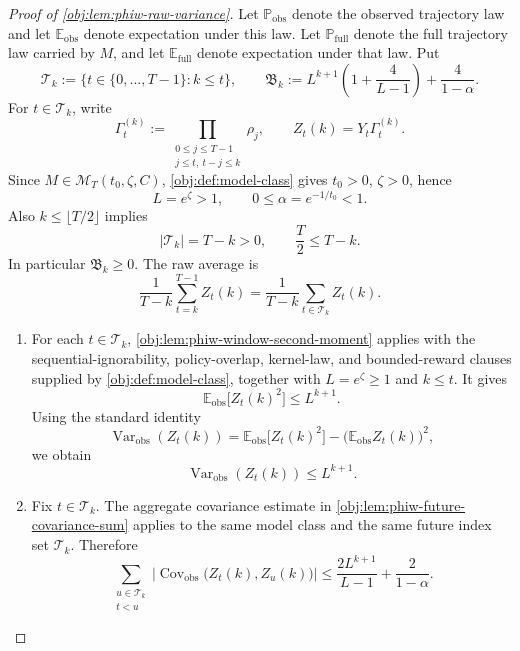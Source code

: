 \documentclass[11pt]{article}
\begin{document}
\begin{proof}[Proof of \cref{obj:lem:phiw-raw-variance}]
Let \(\mathbb P_{\mathrm{obs}}\) denote the observed trajectory law and let
\(\mathbb E_{\mathrm{obs}}\) denote expectation under this law.  Let
\(\mathbb P_{\mathrm{full}}\) denote the full trajectory law carried by \(M\),
and let \(\mathbb E_{\mathrm{full}}\) denote expectation under that law.  Put
\[
\mathscr T_k:=\{t\in\{0,\ldots,T-1\}: k\le t\},
\qquad
\mathfrak B_k:=
L^{k+1}\left(1+\frac{4}{L-1}\right)+\frac{4}{1-\alpha}.
\]
For \(t\in\mathscr T_k\), write
\[
\Gamma_t^{(k)}
:=
\prod_{\substack{0\le j\le T-1\\ j\le t,\ t-j\le k}}\rho_j,
\qquad
Z_t(k)=Y_t\Gamma_t^{(k)} .
\]
Since \(M\in\mathcal M_T(t_0,\zeta,C)\), \cref{obj:def:model-class} gives
\(t_0>0\), \(\zeta>0\), hence
\[
L=e^\zeta>1,
\qquad
0\le \alpha=e^{-1/t_0}<1.
\]
Also \(k\le \lfloor T/2\rfloor\) implies
\[
|\mathscr T_k|=T-k>0,
\qquad
\frac{T}{2}\le T-k.
\]
In particular \(\mathfrak B_k\ge0\).  The raw average is
\[
\frac{1}{T-k}\sum_{t=k}^{T-1} Z_t(k)
=
\frac{1}{T-k}\sum_{t\in\mathscr T_k}Z_t(k).
\]

\begin{enumerate}
\item
For each \(t\in\mathscr T_k\), \cref{obj:lem:phiw-window-second-moment} applies with the sequential-ignorability, policy-overlap, kernel-law, and bounded-reward clauses supplied by \cref{obj:def:model-class}, together with \(L=e^\zeta\ge 1\) and \(k\le t\).  It gives
\[
\mathbb E_{\mathrm{obs}}\bigl[Z_t(k)^2\bigr]
\le L^{k+1}.
\]
Using the standard identity
\[
\operatorname{Var}_{\mathrm{obs}}(Z_t(k))
=
\mathbb E_{\mathrm{obs}}\bigl[Z_t(k)^2\bigr]
-\bigl(\mathbb E_{\mathrm{obs}}Z_t(k)\bigr)^2,
\]
we obtain
\[
\operatorname{Var}_{\mathrm{obs}}(Z_t(k))
\le L^{k+1}.
\]

\item
Fix \(t\in\mathscr T_k\).  The aggregate covariance estimate in \cref{obj:lem:phiw-future-covariance-sum} applies to the same model class and the same future index set \(\mathscr T_k\).  Therefore
\[
\sum_{\substack{u\in\mathscr T_k\\ t<u}}
\left|\operatorname{Cov}_{\mathrm{obs}}\bigl(Z_t(k),Z_u(k)\bigr)\right|
\le
\frac{2L^{k+1}}{L-1}+\frac{2}{1-\alpha}.
\]


\end{enumerate}
\end{proof}
\end{document}
